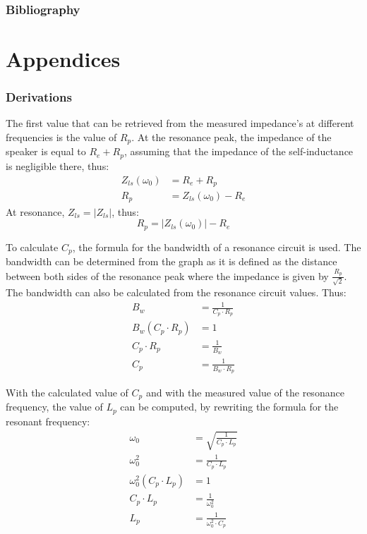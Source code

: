 \documentclass{article}
\newcommand\abs[1]{\left|#1\right|}
\begin{document}
\section{Bibliography}



\newpage\appendix
\part*{Appendices}\label{part:appendices}
\renewcommand{\thesection}{\Alph{section}}

\section{Derivations}\label{app:deriv}
The first value that can be retrieved from the measured impedance's at different frequencies is the value of $R_p$. At the resonance peak, the impedance of the speaker is equal to $R_e + R_p$, assuming that the impedance of the self-inductance is negligible there, thus:
\begin{align*}
    Z_{ls}(\omega_0) &= R_e + R_p\\
    R_p              &= Z_{ls}(\omega_0) - R_e
\end{align*}
At resonance, $Z_{ls} = \abs{Z_{ls}}$, thus:
\begin{equation}
 R_p = \abs{Z_{ls}(\omega_0)} - R_e\label{eq:rp}
\end{equation}

To calculate $C_p$, the formula for the bandwidth of a resonance circuit is used. The bandwidth can be determined from the graph as it is defined as the distance between both sides of the resonance peak where the impedance is given by $\frac{R_p}{\sqrt{2}}$. The bandwidth can also be calculated from the resonance circuit values. Thus:
\begin{align}
  B_w                 &= \frac{1}{C_p \cdot R_p}\nonumber\\
  B_w (C_p \cdot R_p) &= 1\nonumber\\
  C_p \cdot R_p       &= \frac{1}{B_w}\nonumber\\
  C_p                 &= \frac{1}{B_w \cdot R_p}\label{eq:cp}
\end{align}

With the calculated value of $C_p$ and with the measured value of the resonance frequency, the value of $L_p$ can be computed, by rewriting the formula for the resonant frequency:
\begin{align*}
  \omega_0                   &= \sqrt{\frac{1}{C_p \cdot L_p}}\nonumber\\
  \omega_0^2                 &= \frac{1}{C_p \cdot L_p}\nonumber\\
  \omega_0^2 (C_p \cdot L_p) &= 1\nonumber\\
  C_p \cdot L_p              &= \frac{1}{\omega_0^2}\nonumber\\
  L_p                        &= \frac{1}{\omega_0^2 \cdot C_p}
\end{align*}
\end{document}

